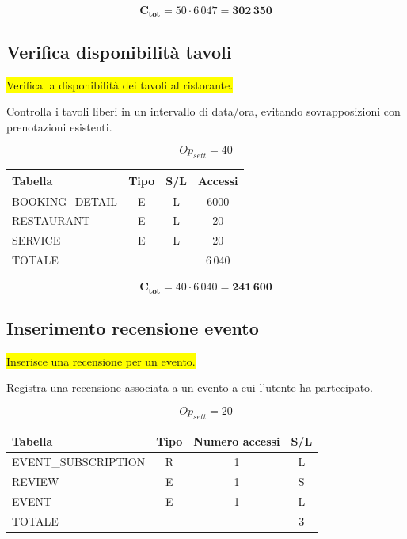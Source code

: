 \documentclass[a4paper,12pt]{report}
\begin{document}
$$\mathbf{C_{tot}} = 50 \cdot 6\,047 = \mathbf{302\,350}$$

\subsection*{Verifica disponibilità tavoli} \label{op8}
\colorbox{yellow}{Verifica la disponibilità dei tavoli al ristorante.}

Controlla i tavoli liberi in un intervallo di data/ora, evitando
sovrapposizioni con prenotazioni esistenti.

$$Op_{sett} = 40$$

\begin{table}[H]
  \centering
  \small
  \renewcommand{\arraystretch}{1.15}
  \begin{tabularx}{0.7\textwidth}{|X|c|c|c|}
    \hline
    \rowcolor{gray!20}
    \textbf{Tabella} & \textbf{Tipo} & \textbf{S/L} & \textbf{Accessi} \\
    \hline
    BOOKING\_DETAIL & E & L & 6000 \\
    RESTAURANT & E & L & 20 \\
    SERVICE & E & L & 20 \\
    \hline
    \rowcolor{gray!20}
    TOTALE & & & 6\,040 \\
    \hline
  \end{tabularx}
  \vspace{-1em}
\end{table}

$$\mathbf{C_{tot}} = 40 \cdot 6\,040 = \mathbf{241\,600}$$

\subsection*{Inserimento recensione evento} \label{op9}
\colorbox{yellow}{Inserisce una recensione per un evento.}

Registra una recensione associata a un evento a cui l'utente ha partecipato.

$$Op_{sett} = 20$$

\begin{table}[H]
  \centering
  \small
  \renewcommand{\arraystretch}{1.15}
  \begin{tabularx}{0.7\textwidth}{|X|c|c|c|}
    \hline
    \rowcolor{gray!20}
    \textbf{Tabella} & \textbf{Tipo} & \textbf{Numero accessi} & \textbf{S/L} \\
    \hline
    EVENT\_SUBSCRIPTION & R & 1 & L \\
    REVIEW & E & 1 & S \\
    EVENT & E & 1 & L \\
    \hline
    \rowcolor{gray!20}
    TOTALE & & & 3\\
    \hline
  \end{tabularx}
  \vspace{-1em}
\end{table}
\end{document}
